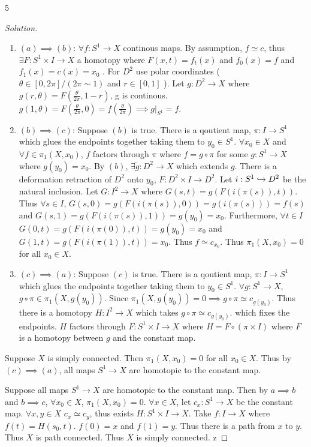 \documentclass{article}
\newcommand*{\x}{\times}
\newenvironment{solution}
{\renewcommand\qedsymbol{$\blacksquare$}\begin{proof}[Solution]}
{\end{proof}}
\begin{document}
\begin{PROB}{5}\label{Problem 5.}
\end{PROB}
\begin{solution}
    \begin{enumerate}
        \item $(a) \implies (b)$: $\forall f: S^1 \to X$ continous maps. By assumption, $f \simeq c$, thus $\exists F: S^1 \times I \to X$ a homotopy where $F(x, t) = f_t(x)$ and $f_0(x) = f$ and $f_1(x) = c(x) = x_0$ . For $D^2$ use polar coordinates ( $\theta \in [0, 2 \pi] / (2 \pi \sim 1)$ and $r \in [0, 1]$ ). Let $g: D^2 \to X$ where $g(r, \theta) = F(\frac{\theta}{2 \pi}, 1 - r)$, g is continous. $g(1, \theta) = F(\frac{\theta}{2 \pi}, 0) = f(\frac{\theta}{2 \pi}) \implies g|_{S^1} = f$.
        \item $(b) \implies (c)$: Suppose $(b)$ is true. There is a qoutient map, $\pi: I \to S^1$ which glues the endpoints together taking them to $y_0 \in S^1$. $\forall x_0 \in X$ and $\forall f \in \pi_{1}(X, x_0)$, $f$ factors through $\pi$ where $f = g \circ \pi$ for some $g: S^1 \to X$ where $g(y_0) = x_0$. By $(b)$, $\exists \tilde{g}: D^2 \to X$ which extends $g$. There is a deformation retraction of $D^2$ onto $y_0$, $F: D^2 \times I \to D^2$. Let $i: S^1 \xhookrightarrow{} D^2$ be the natural inclusion. Let $G: I^2 \to X$ where $G(s, t) = g(F(i(\pi(s)), t))$. Thus $\forall s \in I$, $G(s, 0) = g(F(i(\pi(s)) , 0)) = g(i(\pi(s))) = f(s)$ and $G(s, 1) = g(F(i(\pi(s)), 1)) = g(y_0) = x_0$. Furthermore, $\forall t \in I$ $G(0, t)= g(F(i(\pi(0)), t)) = g(y_0) = x_0$ and $G(1, t) = g(F(i(\pi(1)), t)) = x_0$. Thus $f \simeq c_{x_0}$. Thus $\pi_1(X, x_0) = 0$ for all $x_0 \in X$.
        \item $(c) \implies (a)$: Suppose $(c)$ is true. There is a qoutient map, $\pi: I \to S^1$ which glues the endpoints together taking them to $y_0 \in S^1$. $\forall g: S^1 \to X$, $g \circ \pi \in \pi_1(X, g(y_0))$. Since $\pi_1(X, g(y_0)) = 0 \implies g \circ \pi \simeq c_{g(y_0)}$. Thus there is a homotopy $H: I^2 \to X$ which takes $g \circ \pi \simeq c_{g(y_0)}$. which fixes the endpoints. $H$ factors through $F: S^1 \times I \to X$ where $H = F \circ (\pi \x I)$ where $F$ is a homotopy between $g$ and the constant map.             
    \end{enumerate}
     
    Suppose $X$ is simply connected. Then $\pi_1(X, x_0) = 0$ for all $x_0 \in X$. Thus by $(c) \implies (a)$, all maps $S^1 \to X$ are homotopic to the constant map. 

    Suppose all maps $S^1 \to X$ are homotopic to the constant map. Then by $a \implies b$ and $b \implies c$, $\forall x_0 \in X$, $\pi_1(X, x_0) = 0$. $\forall x \in X$, let $c_x: S^1 \to X$ be the constant map. $\forall x, y \in X$ $c_x \simeq c_y$, thus exists $H: S^1 \times I \to X$. Take $f: I \to X$ where $f(t) = H(s_0, t)$. $f(0) = x$ and $f(1) = y$. Thus there is a path from $x$ to $y$. Thus $X$ is path connected. Thus $X$ is simply connected. z                    
\end{solution}
\end{document}
